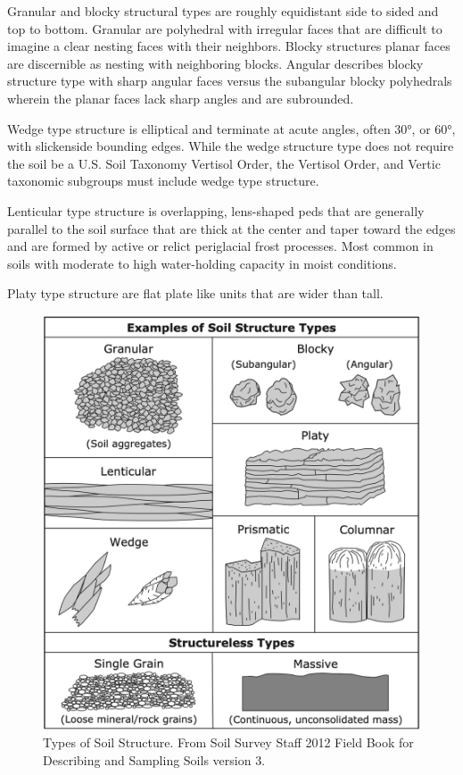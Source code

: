 \documentclass{book}
\begin{document}
Granular and blocky structural types are roughly equidistant side to sided and top to bottom. Granular are polyhedral with irregular faces that are difficult to imagine a clear nesting faces with their neighbors. Blocky structures planar faces are discernible as nesting with neighboring blocks. Angular describes blocky structure type with sharp angular faces versus the subangular blocky polyhedrals wherein the planar faces lack sharp angles and are subrounded.

Wedge type structure is elliptical and terminate at acute angles, often \ang{30}, or \ang{60}, with slickenside bounding edges. While the wedge structure type does not require the soil be a U.S. Soil Taxonomy Vertisol Order, the Vertisol Order, and Vertic taxonomic subgroups must include wedge type structure.

Lenticular type structure is overlapping, lens-shaped peds that are  generally parallel to the soil surface that are thick at the center and taper toward the edges and are formed by active or relict periglacial frost processes. Most common in soils with moderate to high water-holding capacity in moist conditions.

Platy type structure are flat plate like units that are wider than tall.

\begin{figure}
    \centering
    \includegraphics[width=0.8\columnwidth]{images/FieldBookVer3_ExamplesSoilStructureTypes1045x1145.png}
    \caption{Types of Soil Structure. From Soil Survey Staff 2012 Field Book for Describing and Sampling Soils version 3.}
    \label{fig:SoilStructureTypes}
\end{figure}
\end{document}
